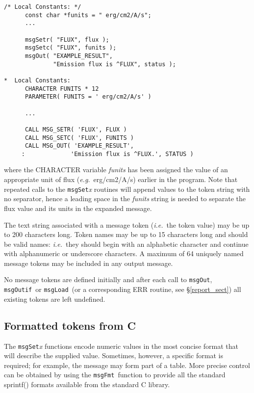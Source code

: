 \documentclass[twoside,11pt]{article}
\newcommand{\htmlref}[2]{#1}
\newcommand{\latex}[1]{#1}
\newcommand{\xlabel}[1]{}
\renewcommand{\_}{\texttt{\symbol{95}}}
\newcommand{\func}[1]{\texttt{#1}}
\newcommand{\farg}[1]{\textit{#1}}
\newcommand{\msgfmt}{\func{msgFmt}}
\newcommand{\msgload}{\func{msgLoad}}
\newcommand{\msgout}{\func{msgOut}}
\newcommand{\msgoutif}{\func{msgOutif}}
\begin{document}
\begin {small}
\begin{verbatim}
/* Local Constants: */
      const char *funits = " erg/cm2/A/s";
      ...

      msgSetr( "FLUX", flux );
      msgSetc( "FLUX", funits );
      msgOut( "EXAMPLE_RESULT",
              "Emission flux is ^FLUX", status );

*  Local Constants:
      CHARACTER FUNITS * 12
      PARAMETER( FUNITS = ' erg/cm2/A/s' )

      ...

      CALL MSG_SETR( 'FLUX', FLUX )
      CALL MSG_SETC( 'FLUX', FUNITS )
      CALL MSG_OUT( 'EXAMPLE_RESULT', 
     :             'Emission flux is ^FLUX.', STATUS )
\end{verbatim}
\end {small}

where the CHARACTER variable \farg{funits} has been assigned the value of an 
appropriate unit of flux (\textit{e.g.}\ erg/cm2/A/s) earlier in the program.
Note that repeated calls to the \func{msgSet}\textit{x} routines will append values 
to the token string with no separator, hence a leading space in the \farg{funits}
string is needed to separate the flux value and its units in the expanded 
message.

The text string associated with a message token (\textit{i.e.}\ the token value)
may be up to 200 characters long.
Token names may be up to 15 characters long and should be valid names:
\textit{i.e.}\ they should begin with an alphabetic character and continue with
alphanumeric or underscore characters.
A maximum of 64 uniquely named message tokens may be included in any output
message. 

No message tokens are defined initially and
after each call to \msgout, \msgoutif\ or \msgload\ (or 
\htmlref{a corresponding ERR 
routine}{report_sect}\latex{, see \S\ref{report_sect}}) 
all existing tokens are left undefined. 

\subsection{\xlabel{c_formatted_tokens}Formatted tokens from C}

The \func{msgSet}\textit{x} functions encode numeric values in the
most concise format that will describe the supplied value.
Sometimes, however, a specific format is required; for example, the message
may form part of a table.  More precise control can be obtained by
using the \msgfmt\ function to provide all the standard sprintf()
formats available from the standard C library.
\end{document}
